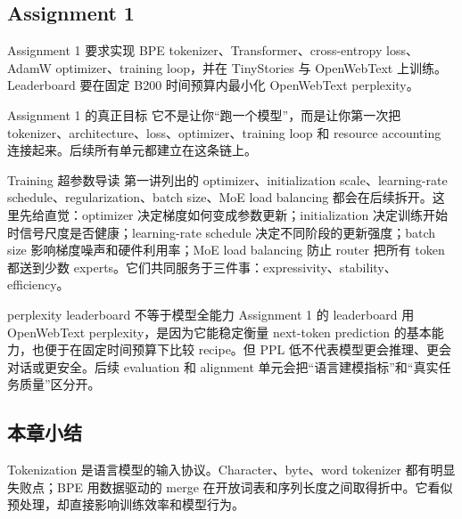\subsection{Assignment 1}

Assignment 1 要求实现 BPE tokenizer、Transformer、cross-entropy loss、AdamW optimizer、training loop，并在 TinyStories 与 OpenWebText 上训练。Leaderboard 要在固定 B200 时间预算内最小化 OpenWebText perplexity。

\begin{importantbox}{Assignment 1 的真正目标}
它不是让你“跑一个模型”，而是让你第一次把 tokenizer、architecture、loss、optimizer、training loop 和 resource accounting 连接起来。后续所有单元都建立在这条链上。
\end{importantbox}

\begin{knowledgebox}{Training 超参数导读}
第一讲列出的 optimizer、initialization scale、learning-rate schedule、regularization、batch size、MoE load balancing 都会在后续拆开。这里先给直觉：optimizer 决定梯度如何变成参数更新；initialization 决定训练开始时信号尺度是否健康；learning-rate schedule 决定不同阶段的更新强度；batch size 影响梯度噪声和硬件利用率；MoE load balancing 防止 router 把所有 token 都送到少数 experts。它们共同服务于三件事：expressivity、stability、efficiency。
\end{knowledgebox}

\begin{warningbox}{perplexity leaderboard 不等于模型全能力}
Assignment 1 的 leaderboard 用 OpenWebText perplexity，是因为它能稳定衡量 next-token prediction 的基本能力，也便于在固定时间预算下比较 recipe。但 PPL 低不代表模型更会推理、更会对话或更安全。后续 evaluation 和 alignment 单元会把“语言建模指标”和“真实任务质量”区分开。
\end{warningbox}

\subsection{本章小结}

Tokenization 是语言模型的输入协议。Character、byte、word tokenizer 都有明显失败点；BPE 用数据驱动的 merge 在开放词表和序列长度之间取得折中。它看似预处理，却直接影响训练效率和模型行为。

